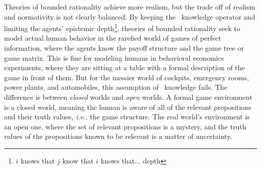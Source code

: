 Theories of bounded rationality achieve more realism, but the trade off of realism and normativity is not clearly balanced. By keeping the \SFive\ knowledge operator and limiting the agents' epistemic depth\footnote{$i$ knows that $j$ know that $i$ knows that... depth}, theories of bounded rationality seek to model actual human behavior in the rarefied world of games of perfect information, where the agents know the payoff structure and the game tree or game matrix. This is fine for modeling humans in behavioral economics experiments, where they are sitting at a table with a formal description of the game in front of them. But for the messier world of cockpits, emergency rooms, power plants, and automobiles, this assumption of \SFive\ knowledge fails. The difference is between \emph{closed} worlds and \emph{open} worlds. A formal game environment is a closed world, meaning the human is aware of all of the relevant propositions and their truth values, \emph{i.e.,} the game structure. The real world's environment is an open one, where the set of relevant propositions is a mystery, and the truth values of the propositions known to be relevant is a matter of uncertainty. 



